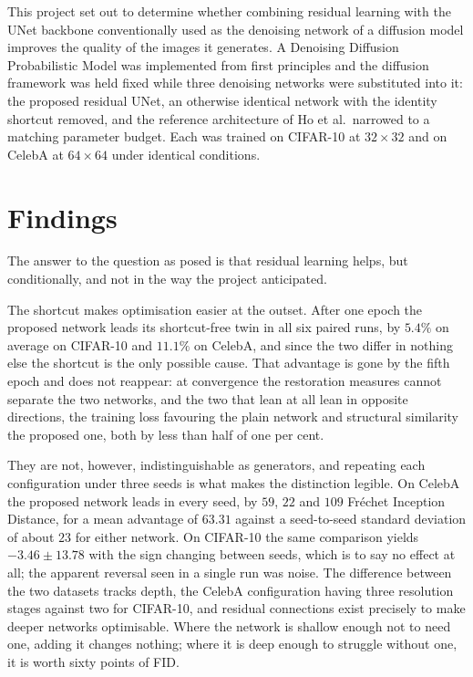 \label{Conclusions}

This project set out to determine whether combining residual learning with the UNet backbone
conventionally used as the denoising network of a diffusion model improves the quality of the images
it generates. A Denoising Diffusion Probabilistic Model was implemented from first principles and
the diffusion framework was held fixed while three denoising networks were substituted into it: the
proposed residual UNet, an otherwise identical network with the identity shortcut removed, and the
reference architecture of Ho et al.\ narrowed to a matching parameter budget. Each was trained on
CIFAR-10 at $32 \times 32$ and on CelebA at $64 \times 64$ under identical conditions.

\section*{Findings}

The answer to the question as posed is that residual learning helps, but conditionally, and not in
the way the project anticipated.

The shortcut makes optimisation easier at the outset. After one epoch the proposed network leads its
shortcut-free twin in all six paired runs, by $5.4\%$ on average on CIFAR-10 and $11.1\%$ on CelebA,
and since the two differ in nothing else the shortcut is the only possible cause. That advantage is
gone by the fifth epoch and does not reappear: at convergence the restoration measures cannot
separate the two networks, and the two that lean at all lean in opposite directions, the training
loss favouring the plain network and structural similarity the proposed one, both by less than half
of one per cent.

They are not, however, indistinguishable as generators, and repeating each configuration under three
seeds is what makes the distinction legible. On CelebA the proposed network leads in every seed, by
$59$, $22$ and $109$ Fr\'echet Inception Distance, for a mean advantage of $63.31$ against a
seed-to-seed standard deviation of about $23$ for either network. On CIFAR-10 the same comparison
yields $-3.46 \pm 13.78$ with the sign changing between seeds, which is to say no effect at all; the
apparent reversal seen in a single run was noise. The difference between the two datasets tracks
depth, the CelebA configuration having three resolution stages against two for CIFAR-10, and
residual connections exist precisely to make deeper networks optimisable. Where the network is
shallow enough not to need one, adding it changes nothing; where it is deep enough to struggle
without one, it is worth sixty points of FID.


